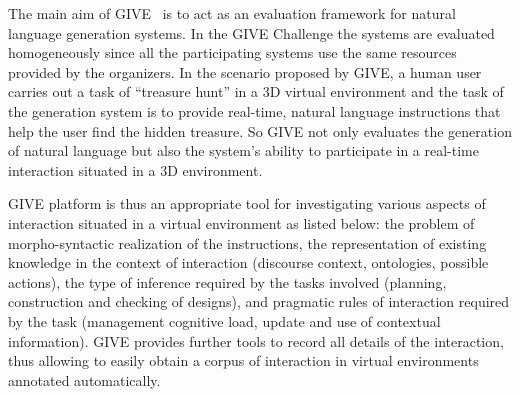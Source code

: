 The main aim of GIVE~\cite{byron09} is to act as an evaluation framework for
natural language generation systems. In the GIVE Challenge the systems are
evaluated homogeneously since all the participating systems use the same
resources provided by the organizers. In the scenario proposed by GIVE, a
human user carries out a task of ``treasure hunt'' in a 3D virtual environment
and the task of the generation system is to provide real-time, natural
language instructions that help the user find the hidden treasure. So GIVE not
only evaluates the generation of natural language but also the system's ability
to participate in a real-time interaction situated in a 3D environment.
% 

GIVE platform is thus an appropriate tool for investigating various aspects of
interaction situated in a virtual environment as listed below: the problem of
morpho-syntactic realization of the instructions, the representation of
existing knowledge in the context of
interaction (discourse context, ontologies, possible actions), the type of
inference required by the tasks involved (planning, construction and checking of
designs), and pragmatic rules of interaction required by the task (management
cognitive load, update and use of contextual information). GIVE provides further
tools to record all details of the interaction, thus allowing to easily obtain a
corpus of interaction in virtual environments annotated automatically.


